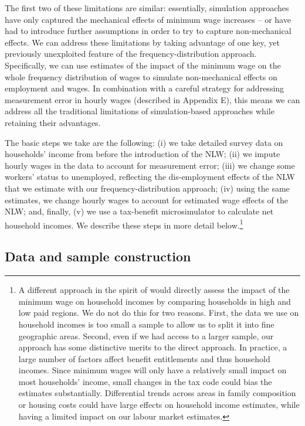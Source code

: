 The first two of these limitations are similar: essentially, simulation approaches have only captured the mechanical effects of minimum wage increases -- or have had to introduce further assumptions in order to try to capture non-mechanical effects. We can address these limitations by taking advantage of one key, yet previously unexploited feature of the frequency-distribution approach. Specifically, we can use estimates of the impact of the minimum wage on the whole frequency distribution of wages to simulate non-mechanical effects on employment and wages. In combination with a careful strategy for addressing measurement error in hourly wages (described in Appendix E), this means we can address all the traditional limitations of simulation-based approaches while retaining their advantages. 

The basic steps we take are the following: (i) we take detailed survey data on households' income from before the introduction of the NLW; (ii) we impute hourly wages in the data to account for measurement error; (iii) we change some workers' status to unemployed, reflecting the dis-employment effects of the NLW that we estimate with our frequency-distribution approach; (iv) using the same estimates, we change hourly wages to account for estimated wage effects of the NLW; and, finally, (v) we use a tax-benefit microsimulator to calculate net household incomes. We describe these steps in more detail below.\footnote{A different approach in the spirit of \citet{Dube2019} would directly assess the impact of the minimum wage on household incomes by comparing households in high and low paid regions. We do not do this for two reasons. First, the data we use on household incomes is too small a sample to allow us to split it into fine geographic areas. Second, even if we had access to a larger sample, our approach has some distinctive merits to the direct approach. In practice, a large number of factors affect benefit entitlements and thus household incomes. Since minimum wages will only have a relatively small impact on most households' income, small changes in the tax code could bias the estimates substantially. Differential trends across areas in family composition or housing costs could have large effects on household income estimates, while having a limited impact on our labour market estimates.} \par

\subsection{Data and sample construction} \label{sec:hh_data}


